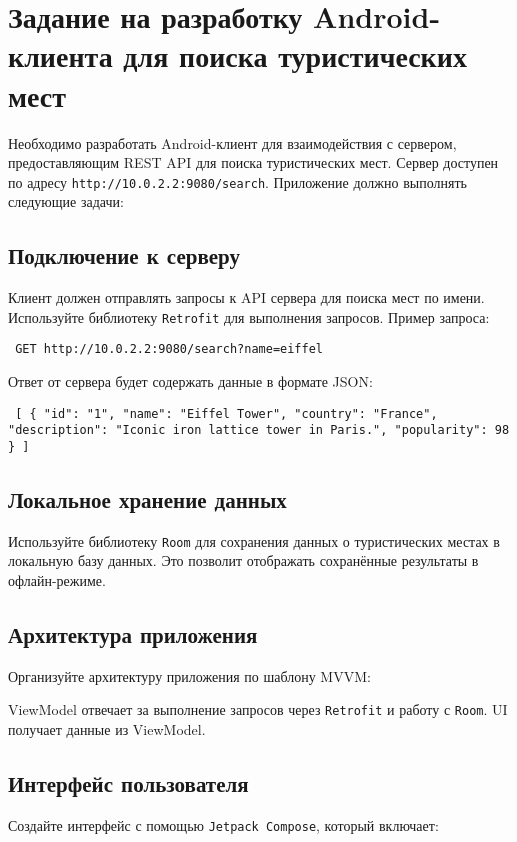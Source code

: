 \section{Задание на разработку Android-клиента для поиска туристических мест}

Необходимо разработать Android-клиент для взаимодействия с сервером, предоставляющим REST API для поиска туристических мест. Сервер доступен по адресу \texttt{http://10.0.2.2:9080/search}. Приложение должно выполнять следующие задачи:

\subsection{Подключение к серверу} Клиент должен отправлять запросы к API сервера для поиска мест по имени. Используйте библиотеку \texttt{Retrofit} для выполнения запросов. Пример запроса:

\begin{verbatim} GET http://10.0.2.2:9080/search?name=eiffel \end{verbatim}

Ответ от сервера будет содержать данные в формате JSON:

\begin{verbatim} [ { "id": "1", "name": "Eiffel Tower", "country": "France", "description": "Iconic iron lattice tower in Paris.", "popularity": 98 } ] \end{verbatim}

\subsection{Локальное хранение данных} Используйте библиотеку \texttt{Room} для сохранения данных о туристических местах в локальную базу данных. Это позволит отображать сохранённые результаты в офлайн-режиме.

\subsection{Архитектура приложения} Организуйте архитектуру приложения по шаблону MVVM:

ViewModel отвечает за выполнение запросов через \texttt{Retrofit} и работу с \texttt{Room}.
UI получает данные из ViewModel.
\subsection{Интерфейс пользователя} Создайте интерфейс с помощью \texttt{Jetpack Compose}, который включает:

